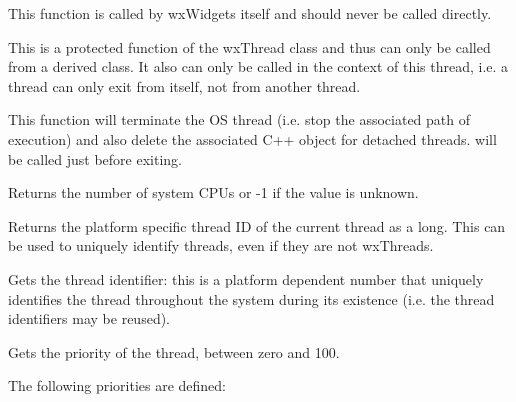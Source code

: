 This function is called by wxWidgets itself and should never be called
directly.


\label{wxthreadexit}


This is a protected function of the wxThread class and thus can only be called
from a derived class. It also can only be called in the context of this
thread, i.e. a thread can only exit from itself, not from another thread.

This function will terminate the OS thread (i.e. stop the associated path of
execution) and also delete the associated C++ object for detached threads.
 will be called just before exiting.


\label{wxthreadgetcpucount}


Returns the number of system CPUs or -1 if the value is unknown.




\label{wxthreadgetcurrentid}


Returns the platform specific thread ID of the current thread as a
long.  This can be used to uniquely identify threads, even if they are
not wxThreads.


\label{wxthreadgetid}


Gets the thread identifier: this is a platform dependent number that uniquely identifies the
thread throughout the system during its existence (i.e. the thread identifiers may be reused).


\label{wxthreadgetpriority}


Gets the priority of the thread, between zero and 100.

The following priorities are defined:

\twocolwidtha{7cm}
\begin{twocollist}\itemsep=0pt
\end{twocollist}


